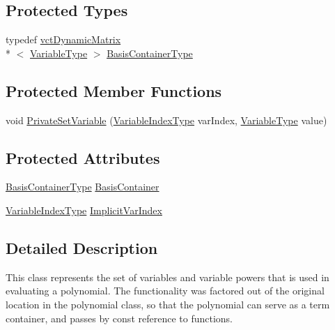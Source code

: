 \subsection*{Protected Types}
\begin{DoxyCompactItemize}
\item 
typedef \hyperlink{classvct_dynamic_matrix}{vct\-Dynamic\-Matrix}\\*
$<$ \hyperlink{classnmr_multi_variable_power_basis_a7089007a79cce8d2eb3672e2d61af06c}{Variable\-Type} $>$ \hyperlink{classnmr_multi_variable_power_basis_ac85dc969184c15d34dd849c4cbd04180}{Basis\-Container\-Type}
\end{DoxyCompactItemize}
\subsection*{Protected Member Functions}
\begin{DoxyCompactItemize}
\item 
void \hyperlink{classnmr_multi_variable_power_basis_a114e29d0c22b8652479f0b119ed74974}{Private\-Set\-Variable} (\hyperlink{classnmr_multi_variable_power_basis_ae125326a623043fcfd020aeeefd1cce6}{Variable\-Index\-Type} var\-Index, \hyperlink{classnmr_multi_variable_power_basis_a7089007a79cce8d2eb3672e2d61af06c}{Variable\-Type} value)
\end{DoxyCompactItemize}
\subsection*{Protected Attributes}
\begin{DoxyCompactItemize}
\item 
\hyperlink{classnmr_multi_variable_power_basis_ac85dc969184c15d34dd849c4cbd04180}{Basis\-Container\-Type} \hyperlink{classnmr_multi_variable_power_basis_ab3a42fd570e56f493446698ddf5dcb76}{Basis\-Container}
\item 
\hyperlink{classnmr_multi_variable_power_basis_ae125326a623043fcfd020aeeefd1cce6}{Variable\-Index\-Type} \hyperlink{classnmr_multi_variable_power_basis_a57dbcaaf1e35dabe83b0aa0a01e8b8e4}{Implicit\-Var\-Index}
\end{DoxyCompactItemize}


\subsection{Detailed Description}
This class represents the set of variables and variable powers that is used in evaluating a polynomial. The functionality was factored out of the original location in the polynomial class, so that the polynomial can serve as a term container, and passes by const reference to functions.

